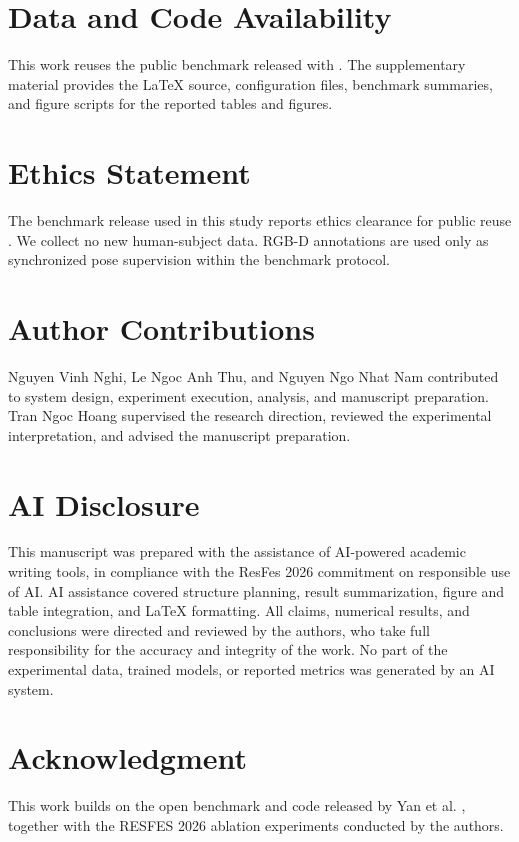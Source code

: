 \documentclass[conference,onecolumn]{IEEEtran}
\begin{document}
\section*{Data and Code Availability}
This work reuses the public benchmark released with \cite{yan2024personwifi3d}. The supplementary material provides the LaTeX source, configuration files, benchmark summaries, and figure scripts for the reported tables and figures.

\section*{Ethics Statement}
The benchmark release used in this study reports ethics clearance for public reuse \cite{yan2024personwifi3d}. We collect no new human-subject data. RGB-D annotations are used only as synchronized pose supervision within the benchmark protocol.

\section*{Author Contributions}
Nguyen Vinh Nghi, Le Ngoc Anh Thu, and Nguyen Ngo Nhat Nam contributed to system design, experiment execution, analysis, and manuscript preparation. Tran Ngoc Hoang supervised the research direction, reviewed the experimental interpretation, and advised the manuscript preparation.

\section*{AI Disclosure}
This manuscript was prepared with the assistance of AI-powered academic writing tools, in compliance with the ResFes 2026 commitment on responsible use of AI. AI assistance covered structure planning, result summarization, figure and table integration, and LaTeX formatting. All claims, numerical results, and conclusions were directed and reviewed by the authors, who take full responsibility for the accuracy and integrity of the work. No part of the experimental data, trained models, or reported metrics was generated by an AI system.

\section*{Acknowledgment}
This work builds on the open benchmark and code released by Yan et al. \cite{yan2024personwifi3d}, together with the RESFES 2026 ablation experiments conducted by the authors.
\end{document}
